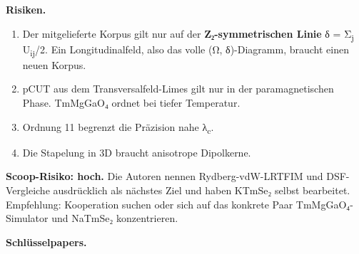 \textbf{Risiken.}

\begin{enumerate}
\def\labelenumi{\arabic{enumi}.}
\tightlist
\item
  Der mitgelieferte Korpus gilt nur auf der \textbf{Z₂-symmetrischen Linie} δ = Σ\textsubscript{j} U\textsubscript{ij}/2. Ein Longitudinalfeld, also das volle (Ω, δ)-Diagramm, braucht einen neuen Korpus.
\item
  pCUT aus dem Transversalfeld-Limes gilt nur in der paramagnetischen Phase. TmMgGaO₄ ordnet bei tiefer Temperatur.
\item
  Ordnung 11 begrenzt die Präzision nahe λ\textsubscript{c}.
\item
  Die Stapelung in 3D braucht anisotrope Dipolkerne.
\end{enumerate}

\textbf{Scoop-Risiko: hoch.} Die Autoren nennen Rydberg-vdW-LRTFIM und DSF-Vergleiche ausdrücklich als nächstes Ziel und haben KTmSe₂ selbst bearbeitet. Empfehlung: Kooperation suchen oder sich auf das konkrete Paar TmMgGaO₄-Simulator und NaTmSe₂ konzentrieren.

\textbf{Schlüsselpapers.}

